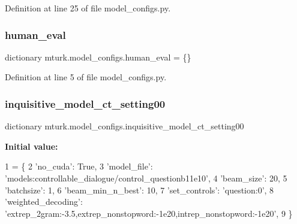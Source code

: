 Definition at line 25 of file model\+\_\+configs.\+py.

\mbox{\label{namespacemturk_1_1model__configs_ab4931ca04682f283e38da749409fa41c}} 
\subsubsection{\texorpdfstring{human\+\_\+eval}{human\_eval}}
{\footnotesize\ttfamily dictionary mturk.\+model\+\_\+configs.\+human\+\_\+eval = \{\}}



Definition at line 5 of file model\+\_\+configs.\+py.

\mbox{\label{namespacemturk_1_1model__configs_add0d0abcb8882069ba9b63764515fcc1}} 
\subsubsection{\texorpdfstring{inquisitive\+\_\+model\+\_\+ct\+\_\+setting00}{inquisitive\_model\_ct\_setting00}}
{\footnotesize\ttfamily dictionary mturk.\+model\+\_\+configs.\+inquisitive\+\_\+model\+\_\+ct\+\_\+setting00}

{\bfseries Initial value\+:}
\begin{DoxyCode}
1 =  \{
2     \textcolor{stringliteral}{'no\_cuda'}: \textcolor{keyword}{True},
3     \textcolor{stringliteral}{'model\_file'}: \textcolor{stringliteral}{'models:controllable\_dialogue/control\_questionb11e10'},
4     \textcolor{stringliteral}{'beam\_size'}: 20,
5     \textcolor{stringliteral}{'batchsize'}: 1,
6     \textcolor{stringliteral}{'beam\_min\_n\_best'}: 10,
7     \textcolor{stringliteral}{'set\_controls'}: \textcolor{stringliteral}{'question:0'},
8     \textcolor{stringliteral}{'weighted\_decoding'}: \textcolor{stringliteral}{'extrep\_2gram:-3.5,extrep\_nonstopword:-1e20,intrep\_nonstopword:-1e20'},
9 \}
\end{DoxyCode}


